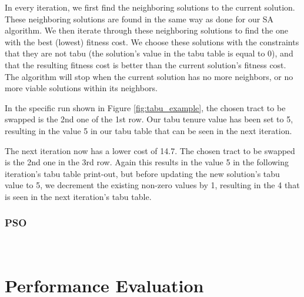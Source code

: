 \documentclass[journal]{IEEEtran}
\begin{document}
In every iteration, we first find the neighboring solutions to the current solution. These neighboring solutions are found in the same way as done for our SA algorithm. We then iterate through these neighboring solutions to find the one with the best (lowest) fitness cost. We choose these solutions with the constraints that they are not tabu (the solution's value in the tabu table is equal to 0), and that the resulting fitness cost is better than the current solution's fitness cost. The algorithm will stop when the current solution has no more neighbors, or no more viable solutions within its neighbors.

In the specific run shown in Figure \ref{fig:tabu_example}, the chosen tract to be swapped is the 2nd one of the 1st row. Our tabu tenure value has been set to 5, resulting in the value 5 in our tabu table that can be seen in the next iteration.

The next iteration now has a lower cost of 14.7. The chosen tract to be swapped is the 2nd one in the 3rd row. Again this results in the value 5 in the following iteration's tabu table print-out, but before updating the new solution's tabu value to 5, we decrement the existing non-zero values by 1, resulting in the 4 that is seen in the next iteration's tabu table. 
 \\

\subsubsection{PSO}~\\


\section{Performance Evaluation}
\end{document}
